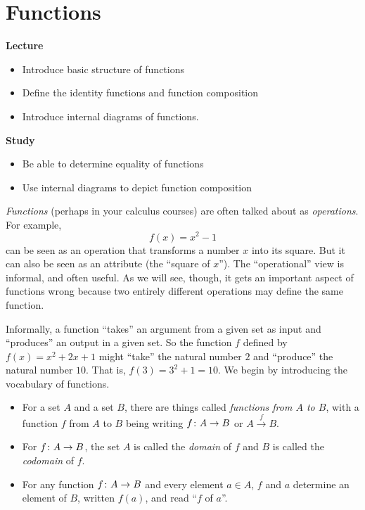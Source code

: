 \chapter{Functions}

\begin{goals}
\noindent\textbf{Lecture}
\begin{itemize}
\item Introduce basic structure of functions
\item Define the identity functions and function composition
\item Introduce internal diagrams of functions.
\end{itemize}

\noindent\textbf{Study}
\begin{itemize}
\item Be able to determine equality of functions
\item Use internal diagrams to depict function composition
\end{itemize}
\end{goals}

\emph{Functions} (perhaps in your calculus courses) are often talked about as \emph{operations}. 
For example, 
\[f(x) = x^2-1\]
can be seen as an operation that transforms a number $x$ into its square.
But it can also be seen as an attribute (the ``square of $x$'').
The ``operational'' view is informal, and often useful.
As we will see, though, it gets an important aspect of functions wrong because two entirely different operations may define the same function.

Informally, a function ``takes'' an argument from a given set as input and ``produces'' an output in a given set.
So the function $f$ defined by $f(x)=x^2 + 2x + 1$ might ``take'' the natural number $2$ and ``produce'' the natural number $10$. 
That is, $f(3)=3^2 + 1 = 10$. 
We begin by introducing the vocabulary of functions.

\begin{signature}
	\begin{itemize}
	\item For a set $A$ and a set $B$, there are things called \emph{functions from $A$ to $B$}, with a function $f$ from $A$ to $B$ being writing ${f}\colon{A}\to{B}$ or $A\stackrel{f}{\to} B$. 

	\item For ${f}\colon{A}\to{B}$, the set $A$ is called the \emph{domain} of $f$ and $B$ is called the \emph{codomain} of $f$.
	
	\item For any function ${f}\colon{A}\to{B}$ and every element $a\in A$, $f$ and $a$ determine an element of $B$, written $f(a)$, and read ``$f$ of $a$''.
	\end{itemize}
\end{signature}

